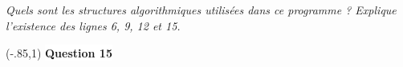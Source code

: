 \documentclass[10pt]{article}
\begin{document}
  \begin{lrbox}{\codebox}
\begin{python}
\end{python}
\end{lrbox}

  
\subparagraph{}
\textit{Quels sont les structures algorithmiques utilisées dans ce programme ? Explique l'existence des lignes 6, 9, 12 et 15.}

\vspace{.3cm}
\noindent\boxput*(-.85,1){
\colorbox{white}{\textbf{Question 15}}}{
\setlength{\fboxsep}{10pt}
}
  
\end{document}
